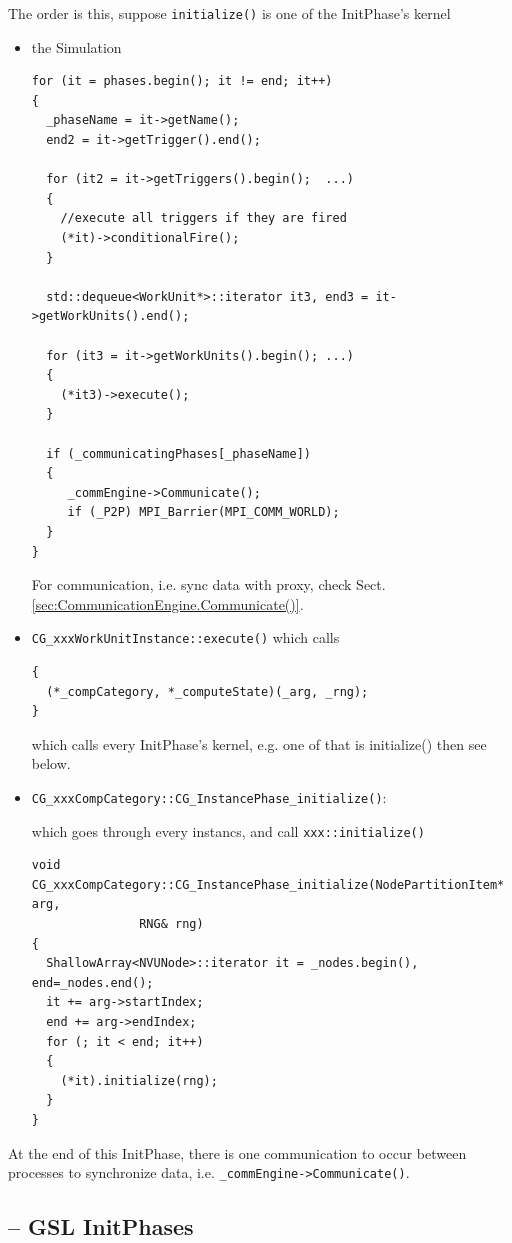 The order is this, suppose \verb!initialize()! is one of the InitPhase's kernel
\begin{itemize}

   \item the Simulation   
\begin{verbatim}
for (it = phases.begin(); it != end; it++)
{
  _phaseName = it->getName();
  end2 = it->getTrigger().end();
  
  for (it2 = it->getTriggers().begin();  ...)
  {
    //execute all triggers if they are fired
    (*it)->conditionalFire();
  }
  
  std::dequeue<WorkUnit*>::iterator it3, end3 = it->getWorkUnits().end();
  
  for (it3 = it->getWorkUnits().begin(); ...)
  {
    (*it3)->execute();
  }
  
  if (_communicatingPhases[_phaseName])
  {
     _commEngine->Communicate();
     if (_P2P) MPI_Barrier(MPI_COMM_WORLD);
  }
}
\end{verbatim}  
For communication, i.e. sync data with proxy, check
Sect.\ref{sec:CommunicationEngine.Communicate()}.
  
  \item \verb!CG_xxxWorkUnitInstance::execute()! which calls 
 
\begin{verbatim}
{
  (*_compCategory, *_computeState)(_arg, _rng);
}
\end{verbatim}
which calls every InitPhase's kernel, e.g. one of that is initialize() then see
below.
  
  
  \item \verb!CG_xxxCompCategory::CG_InstancePhase_initialize()!: 

which goes through every instancs, and call \verb!xxx::initialize()! 
\begin{verbatim}
void CG_xxxCompCategory::CG_InstancePhase_initialize(NodePartitionItem*  arg,
               RNG& rng)
{
  ShallowArray<NVUNode>::iterator it = _nodes.begin(), end=_nodes.end();
  it += arg->startIndex;
  end += arg->endIndex;
  for (; it < end; it++)
  {
    (*it).initialize(rng);
  }
}
\end{verbatim}


\end{itemize}


At the end of this InitPhase, there is one communication to occur between
processes to synchronize data, i.e. \verb!_commEngine->Communicate()!.


\subsection{-- GSL InitPhases}


